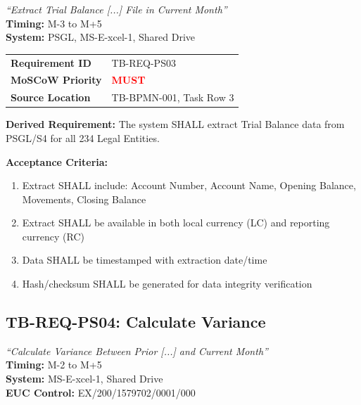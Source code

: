 \documentclass[11pt,a4paper,twoside]{report}
\begin{document}
\begin{tcolorbox}[colback=sourcegreen!5,colframe=sourcegreen!70,title=BPMN Task Extract]
\textit{``Extract Trial Balance [...] File in Current Month''}\\
\textbf{Timing:} M-3 to M+5\\
\textbf{System:} PSGL, MS-E-xcel-1, Shared Drive
\end{tcolorbox}

\begin{tabularx}{\textwidth}{@{}lX@{}}
\toprule
\textbf{Requirement ID} & TB-REQ-PS03 \\
\textbf{MoSCoW Priority} & \textcolor{red}{\textbf{MUST}} \\
\textbf{Source Location} & TB-BPMN-001, Task Row 3 \\
\bottomrule
\end{tabularx}

\textbf{Derived Requirement:} The system SHALL extract Trial Balance data from
PSGL/S4 for all 234 Legal Entities.

\textbf{Acceptance Criteria:}
\begin{enumerate}[label=AC-PS03-\arabic*:]
\item Extract SHALL include: Account Number, Account Name, Opening Balance,
Movements, Closing Balance
\item Extract SHALL be available in both local currency (LC) and reporting
currency (RC)
\item Data SHALL be timestamped with extraction date/time
\item Hash/checksum SHALL be generated for data integrity verification
\end{enumerate}

\subsection{TB-REQ-PS04: Calculate Variance}
\label{req:tb-req-ps04}

\begin{tcolorbox}[colback=sourcegreen!5,colframe=sourcegreen!70,title=BPMN Task Extract]
\textit{``Calculate Variance Between Prior [...] and Current Month''}\\
\textbf{Timing:} M-2 to M+5\\
\textbf{System:} MS-E-xcel-1, Shared Drive\\
\textbf{EUC Control:} EX/200/1579702/0001/000
\end{tcolorbox}
\end{document}
